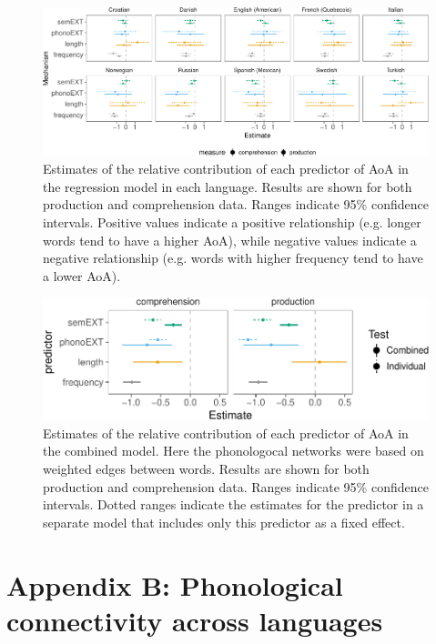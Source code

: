 \documentclass[english,floatsintext,man]{apa6}
\theoremstyle{definition}
\theoremstyle{definition}
\theoremstyle{definition}
\theoremstyle{remark}
\begin{document}
\begin{figure}[!h]
\includegraphics[width=\textwidth]{ms_files/figure-latex/staticPrednt-1} \caption{Estimates of the relative contribution of each predictor of AoA in the regression model in each language. Results are shown for both production and comprehension data. Ranges indicate 95\% confidence intervals. Positive values indicate a positive relationship (e.g. longer words tend to have a higher AoA), while negative values indicate a negative relationship (e.g. words with higher frequency tend to have a lower AoA).}\label{fig:staticPrednt}
\end{figure}

\begin{figure}[!h]
\includegraphics[width=\textwidth]{ms_files/figure-latex/staticAllnt-1} \caption{Estimates of the relative contribution of each predictor of AoA in the combined model. Here the phonologocal networks were based on weighted edges between words. Results are shown for both production and comprehension data. Ranges indicate 95\% confidence intervals. Dotted ranges indicate the estimates for the predictor in a separate model that includes only this predictor as a fixed effect.}\label{fig:staticAllnt}
\end{figure}

\clearpage

\section{Appendix B: Phonological connectivity across
languages}\label{appendix-b-phonological-connectivity-across-languages}
\end{document}
